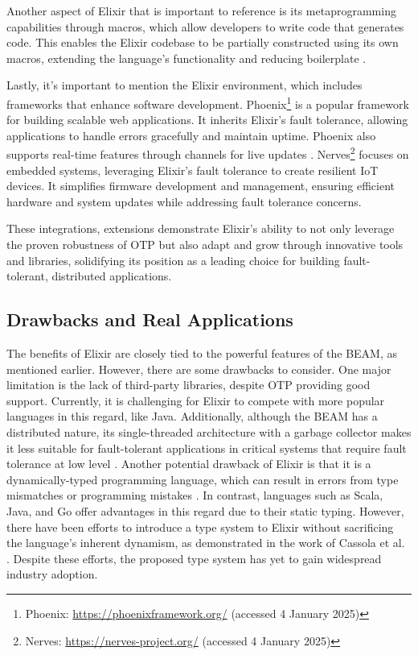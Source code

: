 Another aspect of Elixir that is important to reference is its metaprogramming capabilities through macros, which allow developers to write code that generates code. This enables the Elixir codebase to be partially constructed using its own macros, extending the language's functionality and reducing boilerplate \cite{Juric2024}.

Lastly, it's important to mention the Elixir environment, which includes frameworks that enhance software development. Phoenix\footnote{Phoenix: \url{https://phoenixframework.org/} (accessed 4 January 2025)} is a popular framework for building scalable web applications. It inherits Elixir's fault tolerance, allowing applications to handle errors gracefully and maintain uptime. Phoenix also supports real-time features through channels for live updates \cite{Juric2024}. Nerves\footnote{Nerves: \url{https://nerves-project.org/} (accessed 4 January 2025)} focuses on embedded systems, leveraging Elixir's fault tolerance to create resilient IoT devices. It simplifies firmware development and management, ensuring efficient hardware and system updates while addressing fault tolerance concerns.

These integrations, extensions  demonstrate Elixir’s ability to not only leverage the proven robustness of \gls{OTP} but also adapt and grow through innovative tools and libraries, solidifying its position as a leading choice for building fault-tolerant, distributed applications.

\subsection{Drawbacks and Real Applications}

The benefits of Elixir are closely tied to the powerful features of the \gls{BEAM}, as mentioned earlier. However, there are some drawbacks to consider. One major limitation is the lack of third-party libraries, despite \gls{OTP} providing good support. Currently, it is challenging for Elixir to compete with more popular languages in this regard, like Java. Additionally, although the \gls{BEAM} has a distributed nature, its single-threaded architecture with a garbage collector makes it less suitable for fault-tolerant applications in critical systems that require fault tolerance at low level \cite{Juric2024}. Another potential drawback of Elixir is that it is a dynamically-typed programming language, which can result in errors from type mismatches or programming mistakes \cite{Cassola2020}. In contrast, languages such as Scala, Java, and Go offer advantages in this regard due to their static typing. However, there have been efforts to introduce a type system to Elixir without sacrificing the language's inherent dynamism, as demonstrated in the work of Cassola et al. \cite{Cassola2020}. Despite these efforts, the proposed type system has yet to gain widespread industry adoption.

